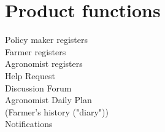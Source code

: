 \section{Product functions}

Policy maker registers\\
Farmer registers\\
Agronomist registers\\
Help Request\\
Discussion Forum\\
Agronomist Daily Plan\\
(Farmer's history ("diary"))\\
Notifications\\